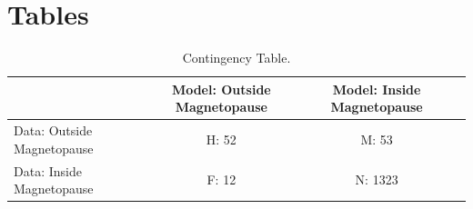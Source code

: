 \documentclass[12pt, letterpaper]{article}
\begin{document}
\section{Tables}
\label{sec:A}
\renewcommand{\arraystretch}{1.5}
\begin{table}[!ht]
\centering
\caption{Contingency Table.}
\begin{tabular}{| l | c | c | c |} %
\hline
\rule{0pt}{4.5mm}
 & Model: Outside Magnetopause & Model: Inside Magnetopause \\
\hline
Data: Outside Magnetopause & H: 52 & M: 53 \\
\hline
Data: Inside Magnetopause & F: 12 & N: 1323 \\
\hline
\end{tabular}
\label{table:1}
\end{table}

\newpage
\end{document}
